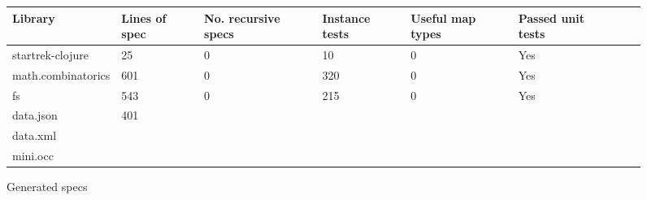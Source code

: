 \begin{figure*}
\begin{tabular}{| l | l | l | l | l | l | l | l |}
  Library            & Lines of spec & No. recursive specs & Instance tests & Useful map types & Passed unit tests \\
  \hline
  startrek-clojure   & 25            & 0                   & 10             & 0                & Yes\\
  math.combinatorics & 601           & 0                   & 320            & 0                & Yes\\
  fs                 & 543           & 0                   & 215            & 0                & Yes \\
  data.json          & 401 \\
  data.xml           & \\
  mini.occ           & \\
\end{tabular}
\caption{Generated specs}
\end{figure*}




% 
% 
%
% 
